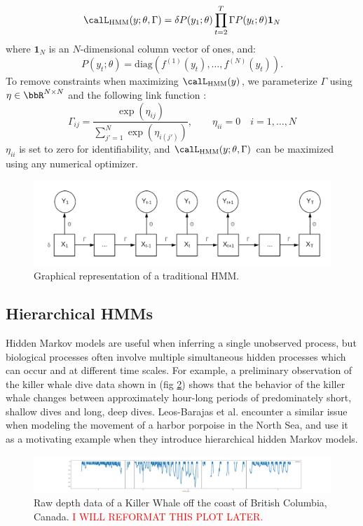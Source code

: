 %
$$\calL_{\text{HMM}}(y;\theta,\Gamma) = \delta P(y_1;\theta) \prod_{t=2}^T \Gamma P(y_t;\theta) \mathbf{1}_N$$
%
where $\mathbf{1}_N$ is an $N$-dimensional column vector of ones, and:
%
$$P(y_t;\theta) = \text{diag}(f^{(1)}(y_t),\ldots , f^{(N)}(y_t)).$$
%
To remove constraints when maximizing $\calL_{\text{HMM}}(y)$, we parameterize $\Gamma$ using $\eta \in \bbR^{N \times N}$ and the following link function \cite{Barajas:2017}:
%
$$\Gamma_{ij} = \frac{\exp(\eta_{ij})}{\sum_{j'=1}^N \exp(\eta_{i(j')})}, \qquad \eta_{ii} = 0 \quad i = 1, \ldots, N$$
%
$\eta_{ii}$ is set to zero for identifiability, and $\calL_{\text{HMM}}(y;\theta,\Gamma)$ can be maximized using any numerical optimizer.

\begin{figure}[h!]
	\centering
	\includegraphics[width=5in]{../Plots/HMM.png}
	\caption{Graphical representation of a traditional HMM.}
	\label{fig:HMM}
\end{figure}

\subsection{Hierarchical HMMs}

Hidden Markov models are useful when inferring a single unobserved process, but biological processes often involve multiple simultaneous hidden processes which can occur and at different time scales. For example, a preliminary observation of the killer whale dive data shown in (fig \ref{fig:data}) shows that the behavior of the killer whale changes between approximately hour-long periods of predominately short, shallow dives and long, deep dives. Leos-Barajas et al. \cite{Barajas:2017} encounter a similar issue when modeling the movement of a harbor porpoise in the North Sea, and use it as a motivating example when they introduce hierarchical hidden Markov models.

\begin{figure}[h!]
	\centering
	\includegraphics[width=5.5in]{../Plots/raw_data.png}
	\caption{Raw depth data of a Killer Whale off the coast of British Columbia, Canada. \textcolor{red}{I WILL REFORMAT THIS PLOT LATER.}}
	\label{fig:data}
\end{figure}

